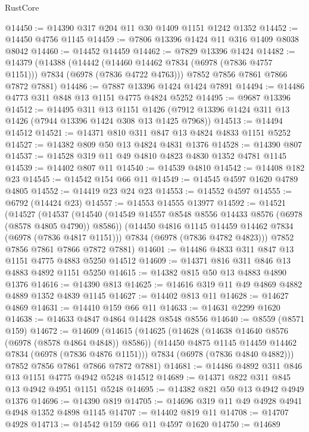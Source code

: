 \begin{lexlean}{RustCore}
\begin{coremodule}
@14450 := @14390 @317 @204 @11 @30 @1409 @1151 @1242 @1352
@14452 := @14450 @4756 @1145
@14459 := @7806 @13396 @1424 @11 @316 @1409 @8038 @8042
@14460 := @14452 @14459
@14462 := @7829 @13396 @1424
@14482 := @14379
    (@14388
      (@14442 (@14460 @14462 @7834 (@6978 (@7836 @4757 @1151))) @7834 (@6978 (@7836 @4722 @4763)))
      @7852
      @7856
      @7861
      @7866
      @7872
      @7881)
@14486 := @7887 @13396 @1424 @1424 @7891
@14494 := @14486 @4773 @311 @848 @13 @1151 @4775 @4824 @5252
@14495 := @9687 @13396
@14512 := @14495
    @311
    @13
    @1151
    @1426
    (@7912 @13396 @1424 @311 @13 @1426 (@7944 @13396 @1424 @308 @13 @1425 @7968))
@14513 := @14494 @14512
@14521 := @14371 @810 @311 @847 @13 @4824 @4833 @1151 @5252
@14527 := @14382 @809 @50 @13 @4824 @4831 @1376
@14528 := @14390 @807
@14537 := @14528 @319 @11 @49 @4810 @4823 @4830 @1352 @4781 @1145
@14539 := @14402 @807 @11
@14540 := @14539 @4810
@14542 := @14408 @182 @23
@14545 := @14542 @154 @66 @11
@14549 := @14545 @4597 @1620 @4789 @4805
@14552 := @14419 @23 @24 @23
@14553 := @14552 @4597
@14555 := @6792 (@14424 @23)
@14557 := @14553 @14555 @13977
@14592 := @14521
    (@14527
      (@14537
        (@14540 (@14549 @14557 @8548 @8556 @14433 @8576 (@6978 (@8578 @4805 @4790)) @8586))
        (@14450 @4816 @1145 @14459 @14462 @7834 (@6978 (@7836 @4817 @1151)))
        @7834
        (@6978 (@7836 @4782 @4823)))
      @7852
      @7856
      @7861
      @7866
      @7872
      @7881)
@14601 := @14486 @4833 @311 @847 @13 @1151 @4775 @4883 @5250 @14512
@14609 := @14371 @816 @311 @846 @13 @4883 @4892 @1151 @5250
@14615 := @14382 @815 @50 @13 @4883 @4890 @1376
@14616 := @14390 @813
@14625 := @14616 @319 @11 @49 @4869 @4882 @4889 @1352 @4839 @1145
@14627 := @14402 @813 @11
@14628 := @14627 @4869
@14631 := @14410 @159 @66 @11
@14633 := @14631 @2299 @1620
@14638 := @14633 @4847 @4864 @14428 @8548 @8556
@14640 := @8559 (@8571 @159)
@14672 := @14609
    (@14615
      (@14625
        (@14628 (@14638 @14640 @8576 (@6978 (@8578 @4864 @4848)) @8586))
        (@14450 @4875 @1145 @14459 @14462 @7834 (@6978 (@7836 @4876 @1151)))
        @7834
        (@6978 (@7836 @4840 @4882)))
      @7852
      @7856
      @7861
      @7866
      @7872
      @7881)
@14681 := @14486 @4892 @311 @846 @13 @1151 @4775 @4942 @5248 @14512
@14689 := @14371 @822 @311 @845 @13 @4942 @4951 @1151 @5248
@14695 := @14382 @821 @50 @13 @4942 @4949 @1376
@14696 := @14390 @819
@14705 := @14696 @319 @11 @49 @4928 @4941 @4948 @1352 @4898 @1145
@14707 := @14402 @819 @11
@14708 := @14707 @4928
@14713 := @14542 @159 @66 @11 @4597 @1620
@14750 := @14689

\end{coremodule}
\end{lexlean}
